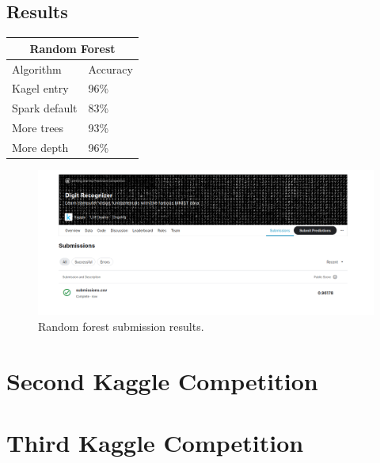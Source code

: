 \documentclass{article}
\begin{document}
	\subsection{Results}
		\begin{tabular}{ |p{3cm}||p{3cm}| }
			\hline
			\multicolumn{2}{|c|}{Random Forest} \\
			\hline
			Algorithm& Accuracy\\
			\hline
			Kagel entry	& 	96\%\\
			Spark default&   83\%\\
			More trees &	93\%\\
			More depth &	96\%\\
			\hline
		\end{tabular}
		\begin{figure}[h]
			\centering
			\includegraphics[scale=0.30]{submission_random_forest}
			\caption{Random forest submission results.}
		\end{figure}
	\section{Second Kaggle Competition}
	\section{Third Kaggle Competition}
\end{document}

